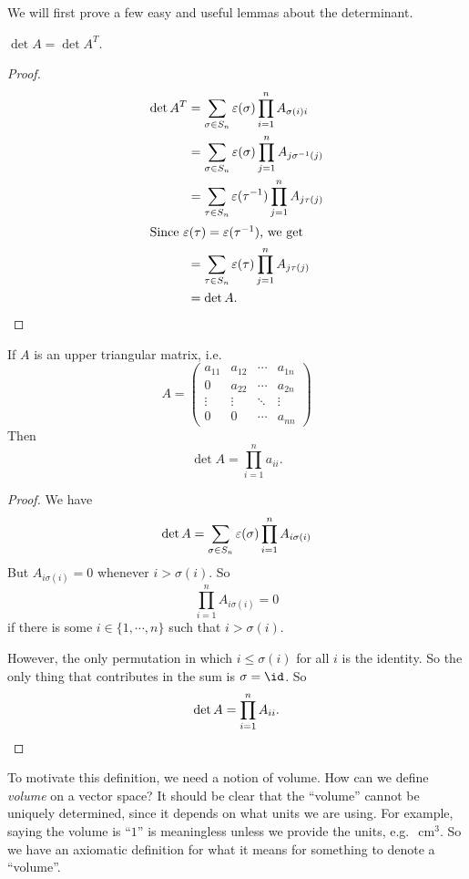 \documentclass[a4paper]{article}
\begin{document}
We will first prove a few easy and useful lemmas about the determinant.
\begin{lemma}
  $\det A = \det A^T$.
\end{lemma}

\begin{proof}
  \begin{align*}
    \det A^T &= \sum_{\sigma \in S_n} \varepsilon(\sigma) \prod_{i = 1}^n A_{\sigma(i)i}\\
    &= \sum_{\sigma \in S_n} \varepsilon (\sigma) \prod_{j = 1}^n A_{j \sigma^{-1}(j)}\\
    &= \sum_{\tau \in S_n} \varepsilon (\tau^{-1}) \prod_{j = 1}^n A_{j \tau (j)}\\
    \intertext{Since $\varepsilon(\tau) = \varepsilon(\tau^{-1})$, we get}
    &= \sum_{\tau \in S_n} \varepsilon (\tau) \prod_{j = 1}^n A_{j \tau (j)}\\
    &= \det A.\qedhere
  \end{align*}
\end{proof}

\begin{lemma}
  If $A$ is an upper triangular matrix, i.e.
  \[
    A =
    \begin{pmatrix}
      a_{11} & a_{12} & \cdots & a_{1n}\\
      0 & a_{22} & \cdots & a_{2n}\\
      \vdots & \vdots & \ddots & \vdots\\
      0 & 0 & \cdots & a_{nn}
    \end{pmatrix}
  \]
  Then
  \[
    \det A = \prod_{i = 1}^n a_{ii}.
  \]
\end{lemma}

\begin{proof}
  We have
  \[
    \det A = \sum_{\sigma \in S_n} \varepsilon(\sigma) \prod_{i = 1}^n A_{i\sigma (i)}\\
  \]
  But $A_{i \sigma(i)} = 0$ whenever $i > \sigma(i)$. So
  \[
    \prod_{i = 1}^n A_{i\sigma(i)} = 0
  \]
  if there is some $i \in \{1, \cdots, n\}$ such that $i > \sigma(i)$.

  However, the only permutation in which $i \leq \sigma(i)$ for all $i$ is the identity. So the only thing that contributes in the sum is $\sigma = \id$. So
  \[
    \det A = \prod_{i = 1}^n A_{ii}.\qedhere
  \]
\end{proof}
To motivate this definition, we need a notion of volume. How can we define \emph{volume} on a vector space? It should be clear that the ``volume'' cannot be uniquely determined, since it depends on what units we are using. For example, saying the volume is ``$1$'' is meaningless unless we provide the units, e.g.\ $\SI{}{\centi\meter\cubed}$. So we have an axiomatic definition for what it means for something to denote a ``volume''.
\end{document}
